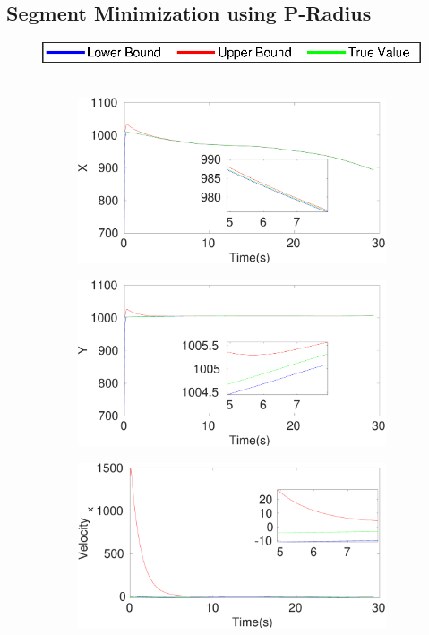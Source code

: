 \clearpage
\subsection{Segment Minimization using P-Radius}
\FloatBarrier
\begin{figure}[h]
\hspace*{\fill} \includegraphics[scale=0.8]{figures/legend}\\\\
\begin{subfigure}{.5\linewidth}
\centering
\includegraphics[width=\linewidth]{figures/Prad/s3cvpradX}
\end{subfigure}
\begin{subfigure}{.5\linewidth}
\centering
\includegraphics[width=\linewidth]{figures/Prad/s3cvpradY}
\end{subfigure}
\begin{subfigure}{.5\linewidth}
\centering
\includegraphics[width=\linewidth]{figures/Prad/s3cvpradVelocity_x}

\end{subfigure}
\end{figure}
